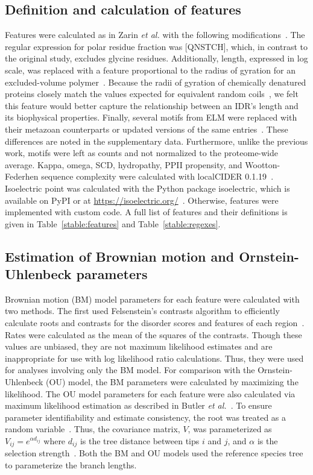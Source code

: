 \subsection{Definition and calculation of features}
Features were calculated as in Zarin \textit{et al.} with the following modifications~\cite{Zarin2019}. The regular expression for polar residue fraction was [QNSTCH], which, in contrast to the original study, excludes glycine residues. Additionally, length, expressed in log scale, was replaced with a feature proportional to the radius of gyration for an excluded-volume polymer~\cite{Flory1949}. Because the radii of gyration of chemically denatured proteins closely match the values expected for equivalent random coils~\cite{Kohn2004}, we felt this feature would better capture the relationship between an IDR's length and its biophysical properties. Finally, several motifs from ELM were replaced with their metazoan counterparts or updated versions of the same entries~\cite{Kumar2021}. These differences are noted in the supplementary data. Furthermore, unlike the previous work, motifs were left as counts and not normalized to the proteome-wide average. Kappa, omega, SCD, hydropathy, PPII propensity, and Wootton-Federhen sequence complexity were calculated with localCIDER 0.1.19~\cite{Holehouse2017}. Isoelectric point was calculated with the Python package isoelectric, which is available on PyPI or at \url{https://isoelectric.org/}~\cite{Kozlowski2016}. Otherwise, features were implemented with custom code. A full list of features and their definitions is given in Table~\ref{stable:features} and Table~\ref{stable:regexes}.

\subsection{Estimation of Brownian motion and Ornstein-Uhlenbeck parameters}
Brownian motion (BM) model parameters for each feature were calculated with two methods. The first used Felsenstein's contrasts algorithm to efficiently calculate roots and contrasts for the disorder scores and features of each region~\cite{Felsenstein1973, Felsenstein1985}. Rates were calculated as the mean of the squares of the contrasts. Though these values are unbiased, they are not maximum likelihood estimates and are inappropriate for use with log likelihood ratio calculations. Thus, they were used for analyses involving only the BM model. For comparison with the Ornstein-Uhlenbeck (OU) model, the BM parameters were calculated by maximizing the likelihood. The OU model parameters for each feature were also calculated via maximum likelihood estimation as described in Butler \textit{et al.}~\cite{Butler2004}. To ensure parameter identifiability and estimate consistency, the root was treated as a random variable~\cite{Ho2013, Ho2014}. Thus, the covariance matrix, $V$, was parameterized as $V_{ij} = e^{\alpha d_{ij}}$ where $d_{ij}$ is the tree distance between tips $i$ and $j$, and $\alpha$ is the selection strength~\cite{Ho2013}. Both the BM and OU models used the reference species tree to parameterize the branch lengths.

